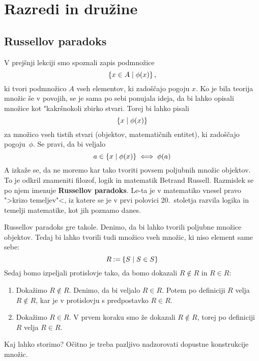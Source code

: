 \chapter{Razredi in družine}

\section{Russellov paradoks}

V prejšnji lekciji smo spoznali zapis podmnožice
%
\begin{equation*}
    \left\{ x \in A \; \middle| \; \phi(x) \right\},
\end{equation*}
%
ki tvori podmnožico $A$ vseh elementov, ki zadoščajo pogoju $x$. Ko je bila
teorija množic še v povojih, se je sama po sebi ponujala ideja, da bi lahko
opisali množice kot "kakršnokoli zbirko stvari. Torej bi lahko pisali
%
\begin{equation*}
    \left\{ x \; \middle| \; \phi(x) \right\}
\end{equation*}
%
za množico vseh tistih stvari (objektov, matematičnih entitet), ki zadoščajo
pogoju~$\phi$. Se pravi, da bi veljalo
%
\begin{equation*}
    a \in \left\{ x \; \middle| \; \phi(x) \right\} \iff \phi(a)
\end{equation*}
%
A izkaže se, da ne moremo kar tako tvoriti povsem poljubnih množic objektov. To
je odkril znameniti filozof, logik in matematik Betrand Russell. Razmislek se po
njem imenuje \textbf{Russellov paradoks}. Le-ta je v matematiko vnesel pravo ">krizo
temeljev"<, iz katere se je v prvi polovici 20.~stoletja razvila logika in
temelji matematike, kot jih poznamo danes.

Russellov paradoks gre takole. Denimo, da bi lahko tvorili poljubne množice
objektov. Tedaj bi lahko tvorili tudi množico vseh množic, ki niso element same
sebe:
%
\begin{equation*}
    R \mathbin{{:}{=}} \left\{ S \; \middle| \; S \in S \right\}
\end{equation*}
%
Sedaj bomo izpeljali protislovje tako, da bomo dokazali $R \not\in R$ in $R \in R$:
%
\begin{enumerate}
\item Dokažimo $R \not\in R$.
  Denimo, da bi veljalo $R \in R$. Potem po definiciji $R$ velja $R \not\in R$, kar
  je v protislovju s predpostavko $R \in R$.

\item
  Dokažimo $R \in R$. V prvem koraku smo že dokazali $R \not\in R$, torej po
  definiciji $R$ velja $R \in R$.
\end{enumerate}
%
Kaj lahko storimo? Očitno je treba pazljivo nadzorovati dopustne konstrukcije
množic.

